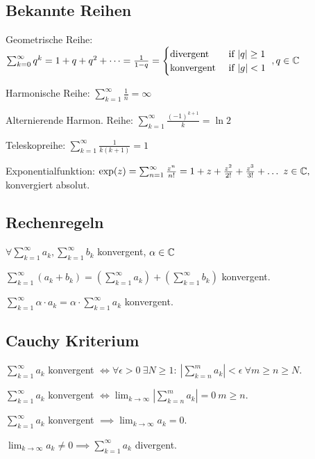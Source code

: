 \subsection{Bekannte Reihen}
\begin{compactdesc}
    \item[Geometrische Reihe:] $\sum_{k=0}^{\infty} q^k = 1 + q + q^2 + \dots = \frac{1}{1-q} =  
        \begin{cases}
            \text{divergent} & \text{ if } |q| \ge 1\\
            \text{konvergent} & \text{ if } |g| < 1
        \end{cases}
    \ , q \in \mathbb{C}
        $
    \item[Harmonische Reihe:] $\sum_{k=1}^{\infty} \frac{1}{n} = \infty$
    \item[Alternierende Harmon. Reihe:] $\sum_{k=1}^{\infty} \frac{(-1)^{k+1}}{k} = \ln 2$
    \item[Teleskopreihe:] $\sum_{k=1}^{\infty} \frac{1}{k(k+1)} = 1$
    \item[Exponentialfunktion:] $\exp(z) = \sum_{n=1}^{\infty} \frac{z^n}{n!} = 1 + z + \frac{z^2}{2!} + \frac{z^3}{3!} + \dots \ z \in \mathbb{C},$ konvergiert absolut.
\end{compactdesc}

\subsection{Rechenregeln}
$\forall \sum_{k=1}^{\infty} a_k, \sum_{k=1}^{\infty} b_k$ konvergent, $\alpha \in \mathbb{C}$ 
\begin{compactenum}
    \item $\sum_{k=1}^{\infty} (a_k + b_k) = \left( \sum_{k=1}^{\infty} a_k \right) + \left( \sum_{k=1}^{\infty} b_k \right)$ konvergent.
    \item $\sum_{k=1}^{\infty} \alpha \cdot a_k = \alpha \cdot \sum_{k=1}^{\infty} a_k$ konvergent.
\end{compactenum}

\subsection{Cauchy Kriterium}
$\sum_{k=1}^{\infty} a_k$ konvergent $\iff \forall \epsilon > 0 \ \exists N \ge 1: \ \left| \sum_{k=n}^{m} a_k \right| < \epsilon \ \forall m \ge  n \ge N$.
\begin{compactitem}
    \item $\sum_{k=1}^{\infty} a_k$ konvergent $\iff \lim_{k \to \infty} \left| \sum_{k=n}^{m} a_k \right| = 0 \ m \ge n$.
    \item $\sum_{k=1}^{\infty} a_k$ konvergent $\implies \lim_{k \to \infty} a_k = 0 $.
    \item $\lim_{k \to \infty} a_k \neq  0 \implies \sum_{k=1}^{\infty} a_k$ divergent.
\end{compactitem}

